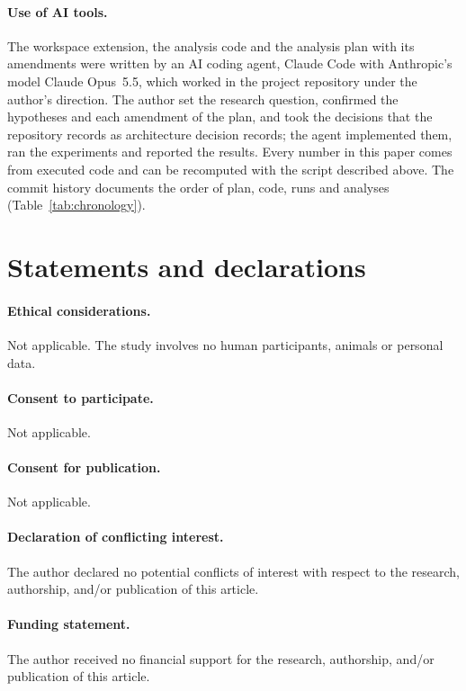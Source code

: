 \documentclass[11pt,a4paper]{article}
\begin{document}
\paragraph{Use of AI tools.} The workspace extension, the analysis code and the analysis plan with its amendments were written by an AI coding agent, Claude Code with Anthropic's model Claude Opus~5.5, which worked in the project repository under the author's direction. The author set the research question, confirmed the hypotheses and each amendment of the plan, and took the decisions that the repository records as architecture decision records; the agent implemented them, ran the experiments and reported the results. Every number in this paper comes from executed code and can be recomputed with the script described above. The commit history documents the order of plan, code, runs and analyses (Table~\ref{tab:chronology}).

\section*{Statements and declarations}

\paragraph{Ethical considerations.} Not applicable. The study involves no human participants, animals or personal data.

\paragraph{Consent to participate.} Not applicable.

\paragraph{Consent for publication.} Not applicable.

\paragraph{Declaration of conflicting interest.} The author declared no potential conflicts of interest with respect to the research, authorship, and/or publication of this article.

\paragraph{Funding statement.} The author received no financial support for the research, authorship, and/or publication of this article.
\end{document}
